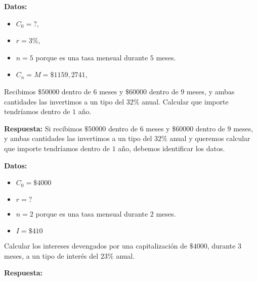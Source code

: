 \documentclass[12pt]{examdesign}
\theoremstyle{plain}
\theoremstyle{definition}
\theoremstyle{remark}
\begin{document}
\begin{shortanswer}[title={Leemos el material de consulta y realizamos las actividades propuestas.}, rearrange=no]
\begin{question}
\begin{answer}
        	    \textbf{Datos:}
        	    
        	    \begin{itemize}
        	    	\item $C_{0}=?$,
        	    	\item $r=3\%$,
        	    	\item $n=5$ porque es una tasa mensual durante $5$ meses.
        	    	\item $C_{n}=M=\$1159,2741$,
        	    \end{itemize}
        	\end{answer}
        \end{question}
        
        \begin{question}
        	Recibimos $\$50000$ dentro de $6$ meses y $\$60000$ dentro de $9$ meses, y ambas cantidades las invertimos a un tipo del $32\%$ anual. Calcular que importe tendríamos dentro de $1$ año.
        	\begin{answer}
        		\textbf{Respuesta:} Si recibimos $\$50000$ dentro de $6$ meses y $\$60000$ dentro de $9$ meses, y ambas cantidades las invertimos a un tipo del $32\%$ anual y queremos calcular que importe tendríamos dentro de $1$ año, debemos identificar los datos.
        		
        		\textbf{Datos:}
        		\begin{itemize}
        			\item $C_{0}=\$4000$
        			\item $r=?$
        			\item $n=2$ porque es una tasa mensual durante $2$ meses.
        			\item $I=\$410$
        		\end{itemize}
        	\end{answer}
        \end{question}
        
        \begin{question}
        	Calcular los intereses devengados por una capitalización de $\$4000$, durante 3 meses, a un tipo de interés del $23\%$ anual.
        	\begin{answer}
        		\textbf{Respuesta:}
        		

\end{answer}
\end{question}
\end{shortanswer}
\end{document}

